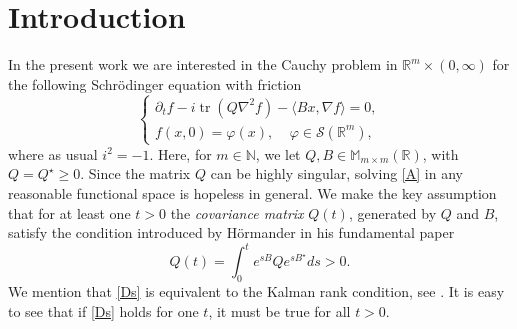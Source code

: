 \documentclass[11pt,a4paper]{amsart}
\def \R {\mathbb{R}}
\def \vf{\varphi}
\newcommand{\Rm}{\mathbb R^m}
\newcommand{\p}{\partial}
\numberwithin{equation}{section}
\numberwithin{equation}{section}
\begin{document}
\section{Introduction}\label{S:intro}


In the present work we are interested in the Cauchy problem 
in $\Rm\times (0,\infty)$ for the following Schr\"odinger equation with friction
\begin{equation}\label{A}
\begin{cases}
\p_t f- i \operatorname{tr}(Q \nabla^2 f) -  \langle B x,\nabla f\rangle  = 0,
\\
f(x,0) = \vf(x),\ \ \ \ \ \vf\in \mathscr S(\Rm),
\end{cases}
\end{equation} 
where as usual $i^2 = - 1$. Here, for $m\in \mathbb N$, we let  $Q, B\in \mathbb M_{m\times m}(\R)$, with $Q = Q^\star \ge 0$. Since the matrix $Q$ can be highly singular, solving \eqref{A} in any reasonable functional space is hopeless in general. We make the key assumption that for at least one $t>0$ the \emph{covariance matrix} $Q(t)$,  generated by $Q$ and $B$, satisfy the  condition introduced by H\"ormander in his fundamental paper \cite{Ho}
\begin{equation}\label{Ds}
Q(t) = \int_0^t e^{sB}Q e^{sB^\star} ds > 0.
\end{equation}
We mention that \eqref{Ds} is equivalent to the Kalman rank condition, see \cite[Theorem 1.2, p. 17]{Z}. It is easy to see that if \eqref{Ds} holds for one $t$, it must be true for all $t>0$.
\end{document}
